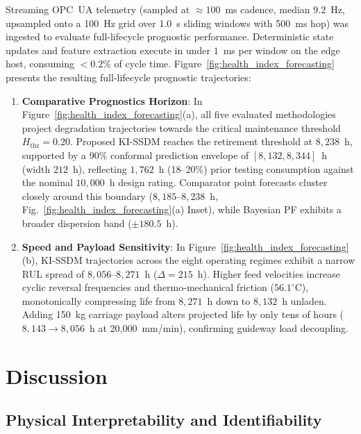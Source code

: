 \documentclass[a4paper,fleqn]{cas-dc}
\begin{document}
Streaming OPC~UA telemetry (sampled at $\approx 100$~ms cadence, median $9.2$~Hz, upsampled onto a 100~Hz grid over 1.0~s sliding windows with 500~ms hop) was ingested to evaluate full-lifecycle prognostic performance. Deterministic state updates and feature extraction execute in under $1$~ms per window on the edge host, consuming $<0.2\%$ of cycle time. Figure~\ref{fig:health_index_forecasting} presents the resulting full-lifecycle prognostic trajectories:
\begin{enumerate}[label=(\alph*),leftmargin=2.2em]
    \item \textbf{Comparative Prognostics Horizon}: In Figure~\ref{fig:health_index_forecasting}(a), all five evaluated methodologies project degradation trajectories towards the critical maintenance threshold $H_{\mathrm{thr}} = 0.20$. Proposed KI-SSDM reaches the retirement threshold at $8{,}238$~h, supported by a 90\% conformal prediction envelope of $[8{,}132, 8{,}344]$~h (width $212$~h), reflecting $1{,}762$~h (18--20\%) prior testing consumption against the nominal $10{,}000$~h design rating. Comparator point forecasts cluster closely around this boundary ($8{,}185\text{--}8{,}238$~h, Fig.~\ref{fig:health_index_forecasting}(a) Inset), while Bayesian PF exhibits a broader dispersion band ($\pm 180.5$~h).
    \item \textbf{Speed and Payload Sensitivity}: In Figure~\ref{fig:health_index_forecasting}(b), KI-SSDM trajectories across the eight operating regimes exhibit a narrow RUL spread of $8{,}056\text{--}8{,}271$~h ($\Delta = 215$~h). Higher feed velocities increase cyclic reversal frequencies and thermo-mechanical friction ($56.1^\circ\mathrm{C}$), monotonically compressing life from $8{,}271$~h down to $8{,}132$~h unladen. Adding 150~kg carriage payload alters projected life by only tens of hours ($8{,}143 \to 8{,}056$~h at 20,000~mm/min), confirming guideway load decoupling.
\end{enumerate}

\section{Discussion}
\label{sec:discussion}

\subsection{Physical Interpretability and Identifiability}
\label{subsec:disc_identifiability}
\end{document}
